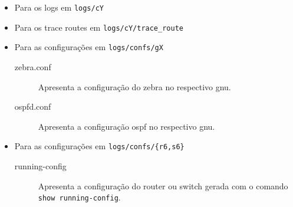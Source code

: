 \documentclass[a4paper,12pt]{article}
\begin{document}
\begin{itemize}
	\item Para os logs em \verb-logs/cY-
	\item Para os trace routes em \verb-logs/cY/trace_route-
	\item Para as configurações em \verb-logs/confs/gX-
		\begin{description}
			\item[zebra.conf] Apresenta a configuração do zebra no respectivo
				gnu.
			\item[ospfd.conf] Apresenta a configuração ospf no respectivo gnu.
		\end{description}
	\item Para as configurações em \verb-logs/confs/{r6,s6}-
		\begin{description}
			\item[running-config] Apresenta a configuração do router ou switch
				gerada com o comando \verb_show running-config_.
		\end{description}
\end{itemize}

%
%
\end{document}
